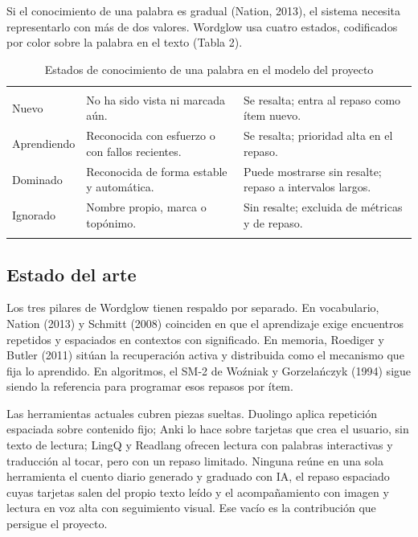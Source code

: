 \documentclass[letterpaper]{wordglow}
\begin{document}
Si el conocimiento de una palabra es gradual (Nation, 2013), el sistema
necesita representarlo con m\'as de dos valores. Wordglow usa cuatro
estados, codificados por color sobre la palabra en el texto (Tabla 2).

\begin{table}[H]
\caption{Estados de conocimiento de una palabra en el modelo del proyecto}
\vskip4pt
\noindent\small
\begin{tabular}{@{}L{1.3in}L{2.5in}L{2.5in}@{}}
 &  & \\
\wgtoprule
Nuevo & No ha sido vista ni marcada a\'un. & Se resalta; entra al repaso como \'item nuevo.\\
\wgrowrule
Aprendiendo & Reconocida con esfuerzo o con fallos recientes. & Se resalta; prioridad alta en el repaso.\\
\wgrowrule
Dominado & Reconocida de forma estable y autom\'atica. & Puede mostrarse sin resalte; repaso a intervalos largos.\\
\wgrowrule
Ignorado & Nombre propio, marca o top\'onimo. & Sin resalte; excluida de m\'etricas y de repaso.\\
\wgrowrule
\end{tabular}
\par\normalsize\vskip4pt
\end{table}

\subsection{Estado del arte}

Los tres pilares de Wordglow tienen respaldo por separado. En
vocabulario, Nation (2013) y Schmitt (2008) coinciden en que el
aprendizaje exige encuentros repetidos y espaciados en contextos con
significado. En memoria, Roediger y Butler (2011) sit\'uan la recuperaci\'on
activa y distribuida como el mecanismo que fija lo aprendido. En
algoritmos, el SM-2 de Wo\'zniak y Gorzela\'nczyk (1994) sigue siendo la
referencia para programar esos repasos por \'item.

Las herramientas actuales cubren piezas sueltas. Duolingo aplica
repetici\'on espaciada sobre contenido fijo; Anki lo hace sobre tarjetas
que crea el usuario, sin texto de lectura; LingQ y Readlang ofrecen
lectura con palabras interactivas y traducci\'on al tocar, pero con un
repaso limitado. Ninguna re\'une en una sola herramienta el cuento diario
generado y graduado con IA, el repaso espaciado cuyas tarjetas salen del
propio texto le\'ido y el acompa\~namiento con imagen y lectura en voz alta
con seguimiento visual. Ese vac\'io es la contribuci\'on que persigue el
proyecto.
\end{document}
